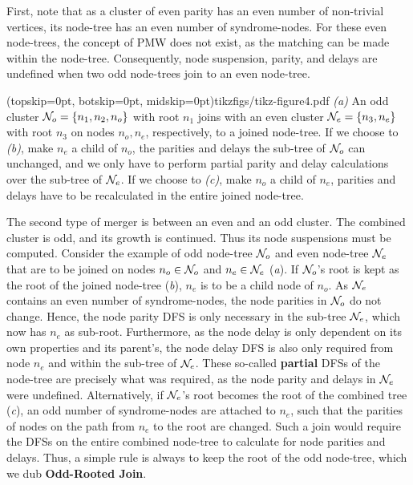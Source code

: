 First, note that as a cluster of even parity has an even number of non-trivial vertices, its node-tree has an even number of syndrome-nodes. For these even node-trees, the concept of PMW does not exist, as the matching can be made within the node-tree. Consequently, node suspension, parity, and delays are undefined when two odd node-trees join to an even node-tree. 

\Figure[hbt](topskip=0pt, botskip=0pt, midskip=0pt){tikzfigs/tikz-figure4.pdf}{
    \emph{(a)} An odd cluster $\mathcal{N}_o=\{n_1, n_2, n_o\}$ with root $n_1$ joins with an even cluster $\mathcal{N}_e=\{n_3, n_e\}$ with root $n_3$ on nodes $n_o, n_e$, respectively, to a joined node-tree. If we choose to \emph{(b)}, make $n_e$ a child of $n_o$, the parities and delays the sub-tree of $\mathcal{N}_o$ can unchanged, and we only have to perform partial parity and delay calculations over the sub-tree of $\mathcal{N}_e$. If we choose to \emph{(c)}, make $n_o$ a child of $n_e$, parities and delays have to be recalculated in the entire joined node-tree. \label{fig4}}

The second type of merger is between an even and an odd cluster. The combined cluster is odd, and its growth is continued. Thus its node suspensions must be computed. Consider the example of odd node-tree $\mathcal{N}_o$ and even node-tree $\mathcal{N}_e$ that are to be joined on nodes $n_o\in \mathcal{N}_o$ and $n_e \in \mathcal{N}_e$ (\emph{a}). If $\mathcal{N}_o$'s root is kept as the root of the joined node-tree (\emph{b}), $n_e$ is to be a child node of $n_o$. As $\mathcal{N}_e$ contains an even number of syndrome-nodes, the node parities in $\mathcal{N}_o$ do not change. Hence, the node parity DFS is only necessary in the sub-tree $\mathcal{N}_e$, which now has $n_e$ as sub-root. Furthermore, as the node delay is only dependent on its own properties and its parent's, the node delay DFS is also only required from node $n_e$ and within the sub-tree of $\mathcal{N}_e$. These so-called \textbf{partial} DFSs of the node-tree are precisely what was required, as the node parity and delays in $\mathcal{N}_e$ were undefined. Alternatively, if $\mathcal{N}_e$'s root becomes the root of the combined tree (\emph{c}), an odd number of syndrome-nodes are attached to $n_e$, such that the parities of nodes on the path from $n_e$ to the root are changed. Such a join would require the DFSs on the entire combined node-tree to calculate for node parities and delays. Thus, a simple rule is always to keep the root of the odd node-tree, which we dub \textbf{Odd-Rooted Join}.

